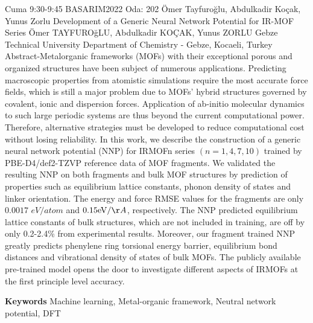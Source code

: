 
    \begin{abstract_basarim}
    {Cuma 9:30-9:45}
    {BASARIM2022}
    {Oda: 202}
    {Ömer Tayfuroğlu, Abdulkadir Koçak, Yunus Zorlu}
    {Development of a Generic Neural Network Potential for IR-MOF Series}
    {%
    Ömer TAYFUROğLU, Abdulkadir KOÇAK, Yunus ZORLU}
    {%
    }
    {%
    Gebze Technical University Department of Chemistry - Gebze, Kocaeli, Turkey}
    Abstract-Metalorganic frameworks (MOFs) with their exceptional porous and organized structures have been subject of numerous applications. Predicting macroscopic properties from atomistic simulations require the most accurate force fields, which is still a major problem due to MOFs' hybrid structures governed by covalent, ionic and dispersion forces. Application of ab-initio molecular dynamics to such large periodic systems are thus beyond the current computational power. Therefore, alternative strategies must be developed to reduce computational cost without losing reliability. In this work, we describe the construction of a generic neural network potential (NNP) for IRMOFn series $(n=1,4,7,10)$ trained by PBE-D4/def2-TZVP reference data of MOF fragments. We validated the resulting NNP on both fragments and bulk MOF structures by prediction of properties such as equilibrium lattice constants, phonon density of states and linker orientation. The energy and force RMSE values for the fragments are only $0.0017$ $e V / a t o m$ and $0.15 \mathrm{eV} / \AA$, respectively. The NNP predicted equilibrium lattice constants of bulk structures, which are not included in training, are off by only 0.2-2.4\% from experimental results. Moreover, our fragment trained NNP greatly predicts phenylene ring torsional energy barrier, equilibrium bond distances and vibrational density of states of bulk MOFs. The publicly available pre-trained model opens the door to investigate different aspects of IRMOFs at the first principle level accuracy. 
    
        \textbf{Keywords} \newline{}Machine learning, Metal-organic framework, Neutral network potential, DFT
    \end{abstract_basarim}
    